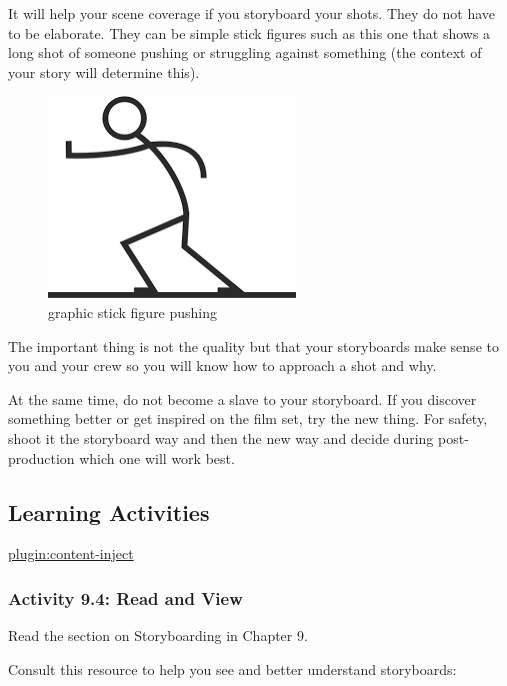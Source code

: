 \documentclass[
]{book}
\begin{document}
It will help your scene coverage if you storyboard your shots. They do not have to be elaborate. They can be simple stick figures such as this one that shows a long shot of someone pushing or struggling against something (the context of your story will determine this).

\begin{figure}
\centering
\includegraphics{assets/unit5/Picture1.png}
\caption{graphic stick figure pushing}
\end{figure}

The important thing is not the quality but that your storyboards make sense to you and your crew so you will know how to approach a shot and why.

At the same time, do not become a slave to your storyboard. If you discover something better or get inspired on the film set, try the new thing. For safety, shoot it the storyboard way and then the new way and decide during post-production which one will work best.

\hypertarget{learning-activities-38}{%
\subsection*{Learning Activities}\label{learning-activities-38}}

\href{../_9-4}{plugin:content-inject}

\hypertarget{activity-9.4-read-and-view}{%
\subsubsection*{Activity 9.4: Read and View}\label{activity-9.4-read-and-view}}

Read the section on Storyboarding in Chapter 9.

Consult this resource to help you see and better understand storyboards:
\end{document}
